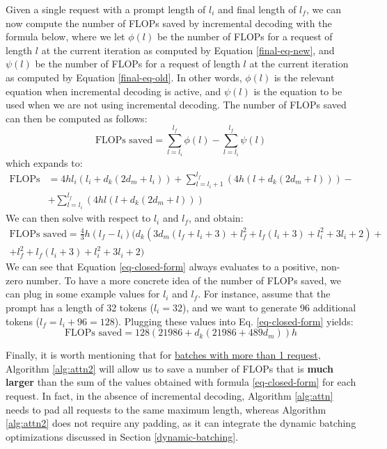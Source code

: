 Given a single request with a prompt length of $l_i$ and final length of $l_f$, we can now compute the number of FLOPs saved by incremental decoding with the formula below, where we let $\phi(l)$ be the number of FLOPs for a request of length $l$ at the current iteration as computed by Equation \ref{final-eq-new}, and $\psi(l)$ be the number of FLOPs for a request of length $l$ at the current iteration as computed by Equation \ref{final-eq-old}. In other words, $\phi(l)$ is the relevant equation when incremental decoding is active, and $\psi(l)$ is the equation to be used when we are not using incremental decoding. The number of FLOPs saved can then be computed as follows:
\begin{equation}
    \text{FLOPs saved} = \sum_{l=l_i}^{l_f}  \phi(l) - \sum_{l=l_i}^{l_f}  \psi(l)
\end{equation}
which expands to:
\begin{equation}
\begin{aligned}
\text{FLOPs saved} &= 4 h l_i \left( l_i + d_k \left(2 d_m + l_i \right)\right) + \sum_{l=l_i+1}^{l_f} \left( 4 h \left( l + d_k \left(2 d_m + l \right)\right) \right) - \\
&+ \sum_{l=l_i}^{l_f} \left( 4 h l (l + d_k (2 d_m + l)) \right )
\end{aligned}
\end{equation}
We can then solve with respect to $l_i$ and $l_f$, and obtain:
\begin{equation}\label{eq-closed-form}
\boxed{\begin{aligned}
    \text{FLOPs saved} = \frac{4}{3} h (l_f-l_i) (d_k \left(3 d_m (l_f+l_i+3)+l_f^2+l_f (l_i+3)+l_i^2+3l_i+2\right)+ \\
   +l_f^2+l_f (l_i+3)+l_i^2+3l_i+2)
\end{aligned}}
\end{equation}
We can see that Equation \ref{eq-closed-form} always evaluates to a positive, non-zero number. To have a more concrete idea of the number of FLOPs saved, we can plug in some example values for $l_i$ and $l_f$. For instance, assume that the prompt has a length of 32 tokens ($l_i=32$), and we want to generate 96 additional tokens ($l_f = l_i + 96 = 128$). Plugging these values into Eq. \ref{eq-closed-form} yields:
\begin{equation}
    \text{FLOPs saved} = 128 (21986 + d_k (21986 + 489 d_m)) h
\end{equation}

Finally, it is worth mentioning that for \underline{batches with more than 1 request}, Algorithm \ref{alg:attn2} will allow us to save a number of FLOPs that is \textbf{much larger} than the sum of the values obtained with formula \ref{eq-closed-form} for each request. In fact, in the absence of incremental decoding, Algorithm \ref{alg:attn} needs to pad all requests to the same maximum length, whereas Algorithm \ref{alg:attn2} does not require any padding, as it can integrate the dynamic batching optimizations discussed in Section \ref{dynamic-batching}. 

